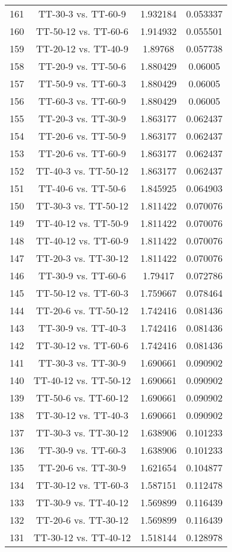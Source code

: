 \documentclass[a4paper,10pt]{article}
\begin{document}
\begin{landscape}
\begin{table}[!htp]
\begin{tabular}{cccc}
161&TT-30-3 vs. TT-60-9&1.932184&0.053337\\
160&TT-50-12 vs. TT-60-6&1.914932&0.055501\\
159&TT-20-12 vs. TT-40-9&1.89768&0.057738\\
158&TT-20-9 vs. TT-50-6&1.880429&0.06005\\
157&TT-50-9 vs. TT-60-3&1.880429&0.06005\\
156&TT-60-3 vs. TT-60-9&1.880429&0.06005\\
155&TT-20-3 vs. TT-30-9&1.863177&0.062437\\
154&TT-20-6 vs. TT-50-9&1.863177&0.062437\\
153&TT-20-6 vs. TT-60-9&1.863177&0.062437\\
152&TT-40-3 vs. TT-50-12&1.863177&0.062437\\
151&TT-40-6 vs. TT-50-6&1.845925&0.064903\\
150&TT-30-3 vs. TT-50-12&1.811422&0.070076\\
149&TT-40-12 vs. TT-50-9&1.811422&0.070076\\
148&TT-40-12 vs. TT-60-9&1.811422&0.070076\\
147&TT-20-3 vs. TT-30-12&1.811422&0.070076\\
146&TT-30-9 vs. TT-60-6&1.79417&0.072786\\
145&TT-50-12 vs. TT-60-3&1.759667&0.078464\\
144&TT-20-6 vs. TT-50-12&1.742416&0.081436\\
143&TT-30-9 vs. TT-40-3&1.742416&0.081436\\
142&TT-30-12 vs. TT-60-6&1.742416&0.081436\\
141&TT-30-3 vs. TT-30-9&1.690661&0.090902\\
140&TT-40-12 vs. TT-50-12&1.690661&0.090902\\
139&TT-50-6 vs. TT-60-12&1.690661&0.090902\\
138&TT-30-12 vs. TT-40-3&1.690661&0.090902\\
137&TT-30-3 vs. TT-30-12&1.638906&0.101233\\
136&TT-30-9 vs. TT-60-3&1.638906&0.101233\\
135&TT-20-6 vs. TT-30-9&1.621654&0.104877\\
134&TT-30-12 vs. TT-60-3&1.587151&0.112478\\
133&TT-30-9 vs. TT-40-12&1.569899&0.116439\\
132&TT-20-6 vs. TT-30-12&1.569899&0.116439\\
131&TT-30-12 vs. TT-40-12&1.518144&0.128978\\

\end{tabular}
\end{table}
\end{landscape}
\end{document}
